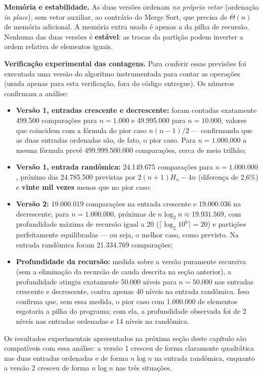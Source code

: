 \qquad \textbf{Memória e estabilidade.} As duas versões ordenam
\textit{no próprio vetor} (ordenação \textit{in place}), sem vetor
auxiliar, ao contrário do Merge Sort, que precisa de $\Theta(n)$ de
memória adicional. A memória extra usada é apenas a da pilha de
recursão. Nenhuma das duas versões é \textbf{estável}: as trocas da
partição podem inverter a ordem relativa de elementos iguais.

\qquad \textbf{Verificação experimental das contagens.} Para conferir
essas previsões foi executada uma versão do algoritmo instrumentada
para contar as operações (usada apenas para esta verificação, fora do
código entregue). Os números confirmam a análise:

\begin{itemize}
    \item \textbf{Versão 1, entradas crescente e decrescente:} foram
    contadas exatamente 499.500 comparações para $n = 1.000$ e
    49.995.000 para $n = 10.000$, valores que coincidem com a fórmula
    do pior caso $n(n-1)/2$ --- confirmando que as duas entradas
    ordenadas são, de fato, o pior caso. Para $n = 1.000.000$ a mesma
    fórmula prevê 499.999.500.000 comparações, cerca de meio trilhão;
    \item \textbf{Versão 1, entrada randômica:} 24.149.675 comparações
    para $n = 1.000.000$, próximo das 24.785.500 previstas por
    $2(n+1)H_n - 4n$ (diferença de 2,6\%) e \textbf{vinte mil vezes}
    menos que no pior caso;
    \item \textbf{Versão 2:} 19.000.019 comparações na entrada
    crescente e 19.000.036 na decrescente, para $n = 1.000.000$,
    próximas de $n \log_2 n \approx 19.931.569$, com profundidade
    máxima de recursão igual a 20 ($\lceil \log_2 10^6 \rceil = 20$) e
    partições perfeitamente equilibradas --- ou seja, o melhor caso,
    como previsto. Na entrada randômica foram 21.334.769 comparações;
    \item \textbf{Profundidade da recursão:} medida sobre a versão
    puramente recursiva (sem a eliminação da recursão de cauda
    descrita na seção anterior), a profundidade atingiu exatamente
    50.000 níveis para $n = 50.000$ nas entradas crescente e
    decrescente, contra apenas 40 níveis na entrada randômica. Isso
    confirma que, sem essa medida, o pior caso com 1.000.000 de
    elementos esgotaria a pilha do programa; com ela, a profundidade
    observada foi de 2 níveis nas entradas ordenadas e 14 níveis na
    randômica.
\end{itemize}

\qquad Os resultados experimentais apresentados na próxima seção deste
capítulo são compatíveis com essa análise: a versão 1 cresceu de forma
claramente quadrática nas duas entradas ordenadas e de forma
$n \log n$ na entrada randômica, enquanto a versão 2 cresceu de forma
$n \log n$ nas três situações.

